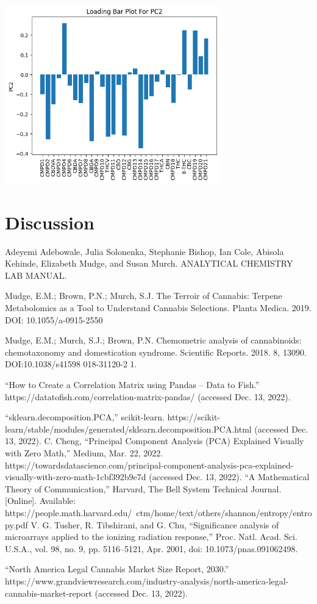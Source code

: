 \documentclass{article}
\begin{document}
\includegraphics[width=0.7\textwidth]{PC2.png}



\section{Discussion}

\begin{thebibliography}{9}
Adeyemi Adebowale, Julia Solonenka, Stephanie Bishop, Ian Cole, Abisola Kehinde, Elizabeth Mudge, and Susan Murch. ANALYTICAL  CHEMISTRY  LAB MANUAL.

Mudge, E.M.; Brown, P.N.; Murch, S.J. The Terroir of Cannabis: Terpene Metabolomics as a Tool
 to Understand Cannabis Selections. Planta Medica. 2019. DOI: 10.1055/a-0915-2550

Mudge, E.M.; Murch, S.J.; Brown, P.N. Chemometric analysis of cannabinoids: chemotaxonomy
 and domestication syndrome. Scientific Reports. 2018. 8, 13090. DOI:10.1038/s41598
 018-31120-2 1. 

“How to Create a Correlation Matrix using Pandas – Data to Fish.” https://datatofish.com/correlation-matrix-pandas/ (accessed Dec. 13, 2022).

“sklearn.decomposition.PCA,” scikit-learn. https://scikit-learn/stable/modules/generated/sklearn.decomposition.PCA.html (accessed Dec. 13, 2022).
C. Cheng, “Principal Component Analysis (PCA) Explained Visually with Zero Math,” Medium, Mar. 22, 2022. https://towardsdatascience.com/principal-component-analysis-pca-explained-visually-with-zero-math-1cbf392b9e7d (accessed Dec. 13, 2022).
“A Mathematical Theory of Communication,” Harvard, The Bell System Technical Journal. [Online]. Available: https://people.math.harvard.edu/~ctm/home/text/others/shannon/entropy/entropy.pdf
V. G. Tusher, R. Tibshirani, and G. Chu, “Significance analysis of microarrays applied to the ionizing radiation response,” Proc. Natl. Acad. Sci. U.S.A., vol. 98, no. 9, pp. 5116–5121, Apr. 2001, doi: 10.1073/pnas.091062498.


“North America Legal Cannabis Market Size Report, 2030.” https://www.grandviewresearch.com/industry-analysis/north-america-legal-cannabis-market-report (accessed Dec. 13, 2022).

\end{thebibliography}
\end{document}
